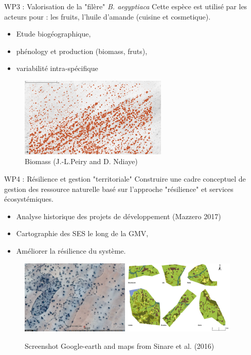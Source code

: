 \documentclass[newPxFont]{beamer}
\begin{document}
\begin{frame}[c]{WP3 : Valorisation de la "filère" \textit{B. aegyptiaca}}
\vspace{-2em}
Cette espèce est utilisé par les acteurs pour  : les fruits, l'huile d'amande (cuisine et cosmetique).
\begin{itemize}
  \item Etude biogéographique,
  \item phénology et production (biomass, fruts),
  \item variabilité intra-spécifique
\end{itemize}
\vspace{-1em}
\begin{figure}
	\centering
	\includegraphics[width = 7cm]{img/Biomasse_arboree}
  \vspace{-1em}
  \caption{Biomass (J.-L.Peiry and D. Ndiaye)}
\end{figure}
\end{frame}

\begin{frame}[c]{WP4 : Résilience et gestion "territoriale"}
\vspace{-2em}
Construire une cadre conceptuel de gestion des ressource naturelle basé sur l'approche "résilience" et services écosystémiques.
\begin{itemize}
  \item Analyse historique des projets de développement (Mazzero 2017)
  \item Cartographie des SES le long de la GMV,
  \item Améliorer la résilience du système.
\end{itemize}
\begin{figure}
	\centering
	\includegraphics[height = 3.5cm]{img/ggearth}
  \includegraphics[height = 3.5cm]{img/Sinare_et_al2016}
  \caption{\small{Screenshot Google-earth and maps from Sinare et al. (2016)}}
\end{figure}
\end{frame}
\end{document}
